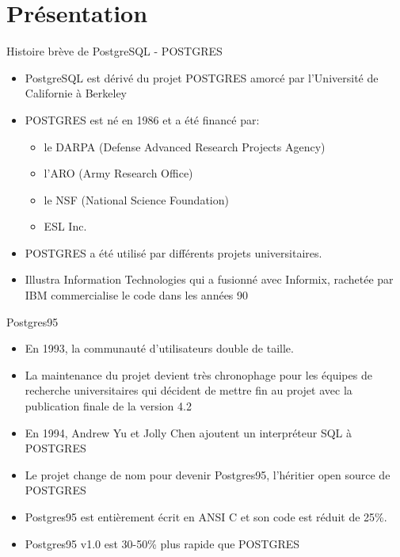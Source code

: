 
\section{Présentation}


\begin{frame}[fragile]{Histoire brève de PostgreSQL - POSTGRES}

   \begin{itemize}
      \item PostgreSQL est dérivé du projet POSTGRES amorcé par l'Université de Californie à Berkeley
      \item POSTGRES est né en 1986 et a été financé par:
      \begin{itemize}
         \item le DARPA (Defense Advanced Research Projects Agency)
         \item l'ARO (Army Research Office)
         \item le NSF (National Science Foundation)
         \item ESL Inc.
      \end{itemize}
      \item POSTGRES a été utilisé par différents projets universitaires.
      \item Illustra Information Technologies qui a fusionné avec Informix, rachetée par IBM commercialise le code dans les années 90
   \end{itemize}

\begin{toile}
\end{toile}

\end{frame}


\begin{frame}[fragile]{Postgres95}

   \begin{itemize}
      \item En 1993, la communauté d'utilisateurs double de taille.
      \item La maintenance du projet devient très chronophage pour les équipes de recherche universitaires qui décident de mettre fin au projet avec la publication finale de la version 4.2
      \item En 1994, Andrew Yu et Jolly Chen ajoutent un interpréteur SQL à POSTGRES
      \item Le projet change de nom pour devenir Postgres95, l'héritier open source de POSTGRES
      \item Postgres95 est entièrement écrit en ANSI C et son code est réduit de 25\%.
      \item Postgres95 v1.0 est 30-50\% plus rapide que POSTGRES
   \end{itemize}

\end{frame}

